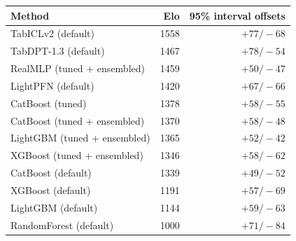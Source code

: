 \begin{tabular}{lrr}
\toprule
Method & Elo & 95\% interval offsets \\
\midrule
TabICLv2 (default) & 1558 & $+77/-68$ \\
TabDPT-1.3 (default) & 1467 & $+78/-54$ \\
RealMLP (tuned + ensembled) & 1459 & $+50/-47$ \\
\rowcolor{orange!12}
LightPFN (default) & 1420 & $+67/-66$ \\
CatBoost (tuned) & 1378 & $+58/-55$ \\
CatBoost (tuned + ensembled) & 1370 & $+58/-48$ \\
LightGBM (tuned + ensembled) & 1365 & $+52/-42$ \\
XGBoost (tuned + ensembled) & 1346 & $+58/-62$ \\
CatBoost (default) & 1339 & $+49/-52$ \\
XGBoost (default) & 1191 & $+57/-69$ \\
LightGBM (default) & 1144 & $+59/-63$ \\
RandomForest (default) & 1000 & $+71/-84$ \\
\bottomrule
\end{tabular}
